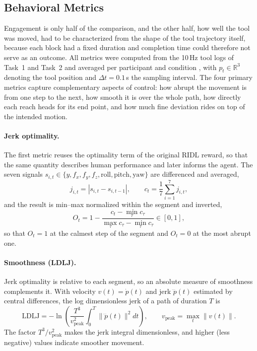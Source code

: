 \documentclass[utf8]{frontiers_suppmat}
\begin{document}
\subsection{Behavioral Metrics}
Engagement is only half of the comparison, and the other half, how well the tool was moved, had to be characterized from the shape of the tool trajectory itself, because each block had a fixed duration and completion time could therefore not serve as an outcome. All metrics were computed from the 10\,Hz tool logs of Task~1 and Task~2 and averaged per participant and condition \cite{Varier2022,Chiu2021}, with $p_t\in\mathbb R^3$ denoting the tool position and $\Delta t=0.1$\,s the sampling interval. The four primary metrics capture complementary aspects of control: how abrupt the movement is from one step to the next, how smooth it is over the whole path, how directly each reach heads for its end point, and how much fine deviation rides on top of the intended motion.

\paragraph*{Jerk optimality.} The first metric reuses the optimality term of the original RIDL reward, so that the same quantity describes human performance and later informs the agent. The seven signals $s_{i,t}\in\{y,f_x,f_y,f_z,\mathrm{roll},\mathrm{pitch},\mathrm{yaw}\}$ are differenced and averaged,
\begin{equation}\label{eq:cj}
j_{i,t}=|s_{i,t}-s_{i,t-1}|,\qquad c_t=\frac17\sum_{i=1}^{7}j_{i,t},
\end{equation}
and the result is min--max normalized within the segment and inverted,
\begin{equation}\label{eq:opt}
O_t=1-\frac{c_t-\min_\tau c_\tau}{\max_\tau c_\tau-\min_\tau c_\tau}\in[0,1],
\end{equation}
so that $O_t=1$ at the calmest step of the segment and $O_t=0$ at the most abrupt one.

\paragraph*{Smoothness (LDLJ).} Jerk optimality is relative to each segment, so an absolute measure of smoothness complements it. With velocity $v(t)=\dot p(t)$ and jerk $\dddot p(t)$ estimated by central differences, the log dimensionless jerk of a path of duration $T$ is
\begin{equation}\label{eq:ldlj}
\mathrm{LDLJ}=-\ln\!\left(\frac{T^{3}}{v_{\mathrm{peak}}^{2}}\int_{0}^{T}\big\|\dddot p(t)\big\|^{2}dt\right),\qquad v_{\mathrm{peak}}=\max_t\|v(t)\|.
\end{equation}
The factor $T^3/v_{\mathrm{peak}}^2$ makes the jerk integral dimensionless, and higher (less negative) values indicate smoother movement.
\end{document}
